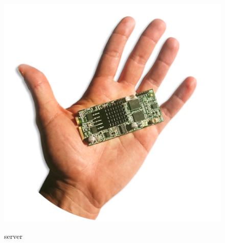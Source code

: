 \begin{figure}[htbp]
\centering
\includegraphics[scale=0.40]{img/Server.png}\\
\caption{server \label{figura1.13} \cite{etichetta9}}
\end{figure}